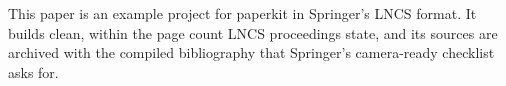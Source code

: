 This paper is an example project for paperkit in Springer's LNCS format. It
builds clean, within the page count LNCS proceedings state, and its sources
are archived with the compiled bibliography that Springer's camera-ready
checklist asks for.
